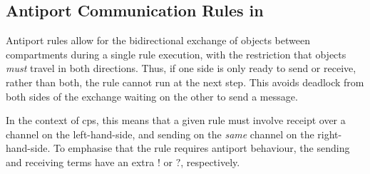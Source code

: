 
\subsection{\label{sec:cps:antiport}Antiport Communication Rules in }


Antiport rules \cite{Orellana-Martin2019,Paun2002} allow for the bidirectional exchange of objects between \glspl{compartment} during a single rule execution, with the restriction that objects \emph{must} travel in both directions.  Thus, if one side is only ready to send or receive, rather than both, the rule cannot run at the next step.  This avoids deadlock from both sides of the exchange waiting on the other to send a message.

In the context of \gls{cps}, this means that a given rule must involve receipt over a channel on the left-hand-side, and sending on the \emph{same} channel on the right-hand-side.  To emphasise that the rule requires antiport behaviour, the sending and receiving terms have an extra \(!\) or \(?\), respectively.

